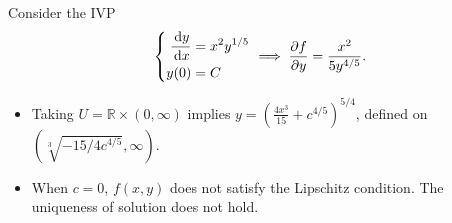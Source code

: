 \begin{example}
Consider the IVP
\[
\left\{
\begin{aligned}
\frac{\,\mathrm{d} y}{\,\mathrm{d} x}&=x^2y^{1/5}\\
y(0)&=C
\end{aligned}
\right.
\implies
\frac{\partial f}{\partial y}=\frac{x^2}{5y^{4/5}}.
\]
\begin{itemize}
\item
Taking $U=\mathbb{R}\times(0,\infty)$ implies $y=\left(\frac{4x^3}{15}+c^{4/5}\right)^{5/4}$, defined on $(\sqrt[3]{-15/4c^{4/5}},\infty)$.
\item
When $c=0$, $f(x,y)$ does not satisfy the Lipschitz condition. The uniqueness of solution does not hold.
\end{itemize}
\end{example}

























